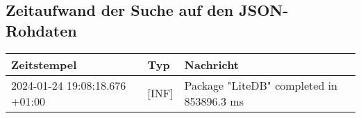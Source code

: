 \subsection{Zeitaufwand der Suche auf den JSON-Rohdaten} \label{subsec:ZeitaufwandSucheJsonRohdaten}
    {
        {\small
            \begin{tabularx}{\textwidth}{|l|l|X|}
                \hline
                \textbf{Zeitstempel} & \textbf{Typ} & \textbf{Nachricht} \\
                \hline
                \endhead
                2024-01-24 19:08:18.676 +01:00 & [INF] & Package "LiteDB" completed in 853896.3 ms \\
                \hline
            \end{tabularx}
        }
    }